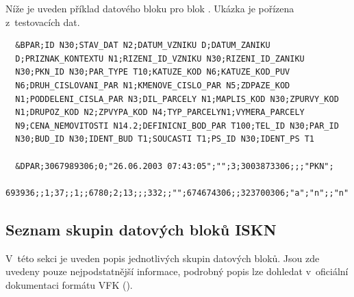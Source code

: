 \documentclass[a4paper,12pt,oneside]{book}
\begin{document}
Níže je uveden příklad datového bloku pro blok . Ukázka je
pořízena z~testovacích dat.

\begin{lstlisting}
  &BPAR;ID N30;STAV_DAT N2;DATUM_VZNIKU D;DATUM_ZANIKU
  D;PRIZNAK_KONTEXTU N1;RIZENI_ID_VZNIKU N30;RIZENI_ID_ZANIKU
  N30;PKN_ID N30;PAR_TYPE T10;KATUZE_KOD N6;KATUZE_KOD_PUV
  N6;DRUH_CISLOVANI_PAR N1;KMENOVE_CISLO_PAR N5;ZDPAZE_KOD
  N1;PODDELENI_CISLA_PAR N3;DIL_PARCELY N1;MAPLIS_KOD N30;ZPURVY_KOD
  N1;DRUPOZ_KOD N2;ZPVYPA_KOD N4;TYP_PARCELYN1;VYMERA_PARCELY
  N9;CENA_NEMOVITOSTI N14.2;DEFINICNI_BOD_PAR T100;TEL_ID N30;PAR_ID
  N30;BUD_ID N30;IDENT_BUD T1;SOUCASTI T1;PS_ID N30;IDENT_PS T1

  &DPAR;3067989306;0;"26.06.2003 07:43:05";"";3;3003873306;;;"PKN";
  693936;;1;37;;1;;6780;2;13;;;332;;"";674674306;;323700306;"a";"n";;"n"
\end{lstlisting}

\subsection*{Seznam skupin datových bloků ISKN}

V~této sekci je uveden popis jednotlivých skupin datových bloků. Jsou
zde uvedeny pouze nejpodstatnější informace, podrobný popis lze
dohledat v~oficiální dokumentaci formátu VFK (\cite{vfk_struktura}).
\end{document}
